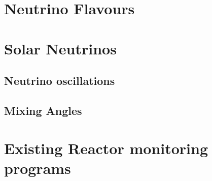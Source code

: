 \documentclass[12pt,a4paper]{article}
\begin{document}
\section{Neutrino Flavours}
\section{Solar Neutrinos}
\subsection{Neutrino oscillations} \label{section_neutrino_oscillations}
\subsection{Mixing Angles}

\section{Existing Reactor monitoring programs}

 

\end{document}
